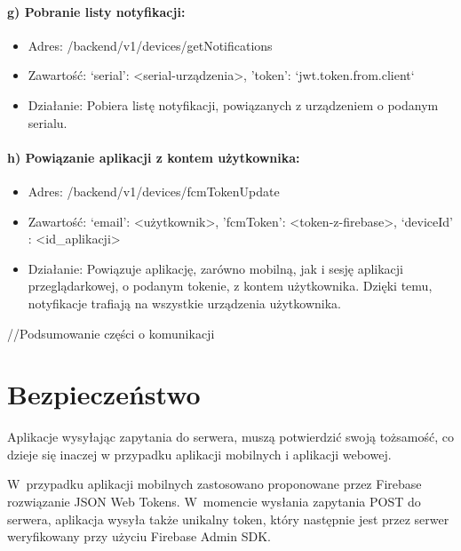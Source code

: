 \paragraph{g) Pobranie listy notyfikacji:}
\begin{itemize}
\item Adres: /backend/v1/devices/getNotifications
\item Zawartość: {‘serial’: <serial-urządzenia>,  'token': `jwt.token.from.client`}
\item Działanie: Pobiera listę notyfikacji, powiązanych z urządzeniem o podanym serialu.
\end{itemize}
\paragraph{h) Powiązanie aplikacji z kontem użytkownika:}
\begin{itemize}
\item Adres: /backend/v1/devices/fcmTokenUpdate
\item Zawartość: {‘email’: <użytkownik>, 'fcmToken': <token-z-firebase>, 
‘deviceId’ : <id_aplikacji>}
\item Działanie: Powiązuje aplikację, zarówno mobilną, jak i sesję aplikacji przeglądarkowej, o podanym tokenie, z kontem użytkownika. Dzięki temu, notyfikacje trafiają na wszystkie urządzenia użytkownika.
\end{itemize}

//Podsumowanie części o komunikacji

\section*{Bezpieczeństwo}

Aplikacje wysyłając zapytania do serwera, muszą potwierdzić swoją tożsamość, co dzieje się inaczej w przypadku aplikacji mobilnych i aplikacji webowej.

W~przypadku aplikacji mobilnych zastosowano proponowane przez Firebase rozwiązanie JSON Web Tokens. W~momencie wysłania zapytania POST do serwera, aplikacja wysyła także unikalny token, który następnie jest przez serwer weryfikowany przy użyciu Firebase Admin SDK.


